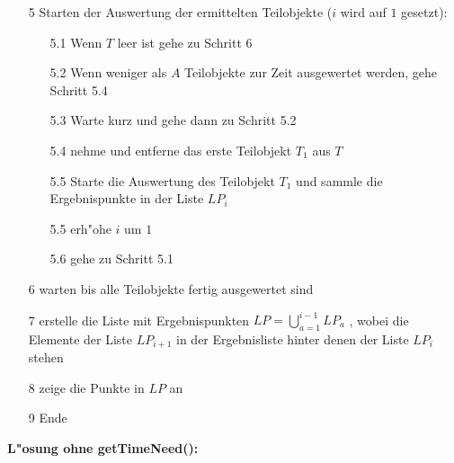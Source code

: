 \begin{itemize}
 \item [5] Starten der Auswertung der ermittelten Teilobjekte ($i$ wird auf $1$ gesetzt):
 \begin{itemize}
  \item [5.1] Wenn $T$ leer ist gehe zu Schritt 6
  \item [5.2] Wenn weniger als $A$ Teilobjekte zur Zeit ausgewertet werden, gehe Schritt 5.4
  \item [5.3] Warte kurz und gehe dann zu Schritt 5.2
  \item [5.4] nehme und entferne das erste Teilobjekt $T_1$ aus $T$
  \item [5.5] Starte die Auswertung des Teilobjekt $T_1$ und sammle die Ergebnispunkte in der Liste $LP_i$
  \item [5.5] erh"ohe $i$ um $1$
  \item [5.6] gehe zu Schritt 5.1
 \end{itemize}
 \item [6] warten bis alle Teilobjekte fertig ausgewertet sind
 \item [7] erstelle die Liste mit Ergebnispunkten $LP=\bigcup_{a=1}^{i-1} LP_a$ , wobei die Elemente der Liste $LP_{i+1}$ in der Ergebnisliste hinter denen der Liste $LP_i$ stehen
 \item [8] zeige die Punkte in $LP$ an
 \item [9] Ende
\end{itemize}


\bigskip\noindent
\textbf{L"osung ohne getTimeNeed():}

